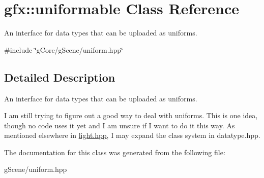 \hypertarget{classgfx_1_1uniformable}{\section{gfx\-:\-:uniformable Class Reference}
\label{classgfx_1_1uniformable}
}


An interface for data types that can be uploaded as uniforms.  




{\ttfamily \#include \char`\"{}g\-Core/g\-Scene/uniform.\-hpp\char`\"{}}



\subsection{Detailed Description}
An interface for data types that can be uploaded as uniforms. 

I am still trying to figure out a good way to deal with uniforms. This is one idea, though no code uses it yet and I am unsure if I want to do it this way. As mentioned elsewhere in \hyperlink{light_8hpp_source}{light.\-hpp}, I may expand the class system in datatype.\-hpp. 

The documentation for this class was generated from the following file\-:\begin{DoxyCompactItemize}
\item 
g\-Scene/uniform.\-hpp\end{DoxyCompactItemize}
